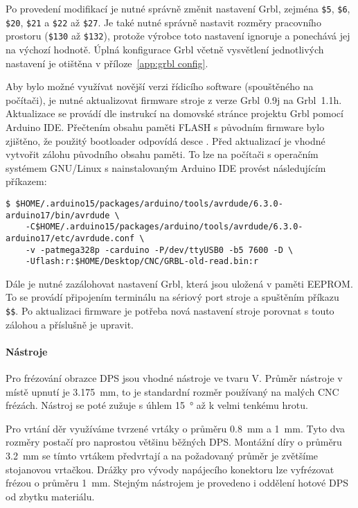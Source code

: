 Po provedení modifikací je nutné správně změnit nastavení Grbl, zejména
\verb|$5|, \verb|$6|, \verb|$20|, \verb|$21| a \verb|$22| až \verb|$27|.
Je také nutné správně nastavit rozměry pracovního prostoru (\verb|$130| až
\verb|$132|), protože výrobce toto nastavení ignoruje a ponechává jej na
výchozí hodnotě. Úplná konfigurace Grbl včetně vysvětlení jednotlivých
nastavení je otištěna v příloze~\vref{app:grbl config}.

Aby bylo možné využívat novější verzi řídicího software (spouštěného na
počítači), je nutné aktualizovat firmware stroje z verze Grbl~0.9j na
Grbl~1.1h. Aktualizace se provádí dle instrukcí na domovské stránce projektu
Grbl pomocí Arduino IDE. Přečtením obsahu paměti FLASH s původním firmware bylo
zjištěno, že použitý bootloader odpovídá desce . Před aktualizací je vhodné vytvořit zálohu původního obsahu
paměti. To lze na počítači s operačním systémem GNU/Linux s nainstalovaným
Arduino IDE provést následujícím příkazem:
\begin{lstlisting}[style=terminal]
$ $HOME/.arduino15/packages/arduino/tools/avrdude/6.3.0-arduino17/bin/avrdude \
    -C$HOME/.arduino15/packages/arduino/tools/avrdude/6.3.0-arduino17/etc/avrdude.conf \
    -v -patmega328p -carduino -P/dev/ttyUSB0 -b5 7600 -D \
    -Uflash:r:$HOME/Desktop/CNC/GRBL-old-read.bin:r
\end{lstlisting}
Dále je nutné zazálohovat nastavení Grbl, která jsou uložená v paměti EEPROM.
To se provádí připojením terminálu na sériový port stroje a spuštěním příkazu
\verb|$$|.
Po aktualizaci firmware je potřeba nová nastavení stroje porovnat s touto
zálohou a příslušně je upravit.

\paragraph{Nástroje}
Pro frézování obrazce DPS jsou vhodné nástroje ve tvaru V. Průměr nástroje
v místě upnutí je \SI{3,175}{\milli\meter}, to je standardní rozměr používaný
na malých CNC frézách. Nástroj se poté zužuje s úhlem
\SI{15}{\degree} až k velmi tenkému hrotu.

Pro vrtání děr využíváme tvrzené vrtáky o průměru \SI{0,8}{\milli\meter}
a \SI{1}{\milli\meter}. Tyto dva rozměry postačí pro naprostou většinu běžných
DPS. Montážní díry o průměru \SI{3,2}{\milli\meter} se tímto vrtákem předvrtají
a na požadovaný průměr je zvětšíme stojanovou vrtačkou. Drážky pro vývody
napájecího konektoru lze vyfrézovat frézou \uv{corn bit} o průměru
\SI{1}{\milli\meter}. Stejným nástrojem je provedeno i oddělení hotové DPS od
zbytku materiálu.

